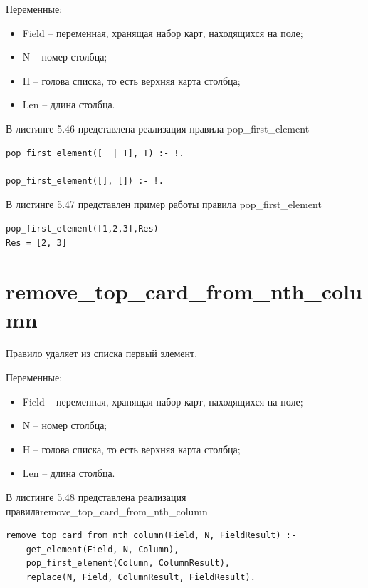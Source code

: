 \documentclass[12pt]{report}
\begin{document}
Переменные:
\begin{itemize}
\item Field – переменная, хранящая набор карт, находящихся на поле;
\item N – номер столбца;
\item H – голова списка, то есть верхняя карта столбца;
\item Len – длина столбца.
\end{itemize}

В листинге 5.46 представлена реализация правила pop\_first\_element

\begin{lstlisting}[label=some-code, caption=реализация правила pop\_first\_element]
pop_first_element([_ | T], T) :- !.

pop_first_element([], []) :- !.
\end{lstlisting}
В листинге 5.47 представлен пример работы правила pop\_first\_element

\begin{lstlisting}[label=some-code, caption=пример работы правила pop\_first\_element]
pop_first_element([1,2,3],Res)
Res = [2, 3]
\end{lstlisting}
\section{remove\_top\_card\_from\_nth\_column}
Правило удаляет из списка первый элемент.

Переменные:
\begin{itemize}
\item Field – переменная, хранящая набор карт, находящихся на поле;
\item N – номер столбца;
\item H – голова списка, то есть верхняя карта столбца;
\item Len – длина столбца.
\end{itemize}

В листинге 5.48 представлена реализация правила\newline remove\_top\_card\_from\_nth\_column

\begin{lstlisting}[label=some-code, caption=реализация правила remove\_top\_card\_from\_nth\_column]
remove_top_card_from_nth_column(Field, N, FieldResult) :-
	get_element(Field, N, Column),
	pop_first_element(Column, ColumnResult),
	replace(N, Field, ColumnResult, FieldResult).
\end{lstlisting}
\end{document}
